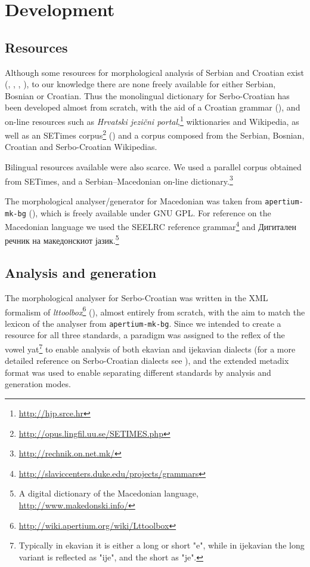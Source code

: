 \documentclass{book}
\begin{document}
\section{Development}
\subsection*{Resources}
Although some resources for morphological analysis of Serbian and Croatian exist
(\citealp{vitas2004intex}, \citealp{vitas2003processing}, \citealp{agic2008improving}, \citealp{snajder08automatic}), 
to our knowledge there are none freely available for either Serbian, Bosnian or 
Croatian. Thus the monolingual dictionary for Serbo-Croatian has been developed 
almost from scratch, with the aid of a Croatian grammar (\citealp{baric1997hrvatska}), 
and on-line resources such as \emph{Hrvatski jezični portal},\footnote{\url{http://hjp.srce.hr}}
wiktionaries and Wikipedia, as well as an SETimes corpus\footnote{\url{http://opus.lingfil.uu.se/SETIMES.php}} (\citealp{tyers2010south}) and a 
corpus composed from the Serbian, Bosnian, Croatian and Serbo-Croatian Wikipedias.

Bilingual resources available were also scarce. We used a parallel corpus obtained from
SETimes, and a Serbian--Macedonian on-line dictionary.\footnote{\url{http://rechnik.on.net.mk/}}

The morphological analyser/generator for Macedonian was taken from
{\small{\tt apertium-mk-bg}} (\citealp{rangelov2011rule}), which is freely available under GNU GPL.
For reference on the Macedonian language we used the SEELRC reference grammar\footnote{\url{http://slaviccenters.duke.edu/projects/grammars}} and
Дигитален речник на македонскиот јазик.\footnote{A digital dictionary of the Macedonian language, \url{http://www.makedonski.info/}}

\subsection*{Analysis and generation}
The morphological analyser for Serbo-Croatian was written in the XML formalism of
\emph{lttoolbox}\footnote{\url{http://wiki.apertium.org/wiki/Lttoolbox}} (\citealp{rojas2005construccion}), almost entirely from scratch, with the
aim to match the lexicon of the analyser from {\small{\tt apertium-mk-bg}}. Since we intended to create a resource for all three
standards, a paradigm was assigned
to the reflex of the vowel yat\footnote{Typically in ekavian it is either a long or short "e", while in ijekavian the long variant is reflected as "ije", and the short as "je".} to enable analysis of both ekavian and ijekavian dialects (for a more detailed reference on Serbo-Croatian dialects see \citealp{brown2004handbook}), and the extended metadix format was used to enable separating different standards by
analysis and generation modes.
\end{document}

